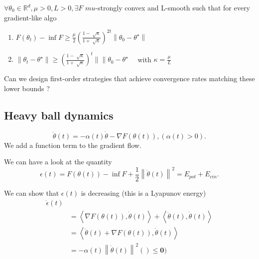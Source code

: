 \begin{thm}[Nesterov 2003]
    $ \forall \theta _0 \in \mathbb{R}^d, \mu > 0, L > 0, \exists F $ $ mu $-strongly convex and L-smooth such that for every gradient-like algo \begin{enumerate}
        \item $ F(\theta _t) - \inf F \geq  \frac{\mu }{2} ( \frac{1 - \sqrt[]{\kappa }}{1 + \sqrt[]{\kappa }} )^{2t} \left\| \theta _0 - \theta ^\star  \right\|  $ 
        \item $\left\| \theta _t - \theta ^{\star } \right\| \geq (\frac{1 - \sqrt[]{\kappa }}{1 + \sqrt[]{\kappa }})^t \left\|  \right\| \theta _0 - \theta ^{\star } \quad $ with $\kappa = \frac{\mu }{L}$ 
    \end{enumerate}
\end{thm}

Can we design first-order strategies that achieve convergence rates matching these lower bounds ? 

\subsection{Heavy ball dynamics}

\[
    \ddot{\theta }(t) = - \alpha (t) \dot{\theta } - \nabla F(\theta (t)), (\alpha (t) > 0 )
.\]
We add a function term to the gradient flow. 

We can have a look at the quantity 
\[
    \epsilon (t) = F(\theta (t)) - \inf F + \frac{1}{2} \left\| \dot{\theta }(t) \right\| ^2 = E_{pot} + E_{cin}
.\]

We can show that $ \epsilon (t) $ is decreasing (this is a Lyapunov energy) 
\begin{align*}
    \dot{\epsilon }(t) \\
        &= \left\langle \nabla F(\theta (t)) , \dot{\theta }(t) \right\rangle + \left\langle \ddot{\theta }(t) , \dot{\theta }(t) \right\rangle \\
        &= \left\langle \ddot{\theta }(t) + \nabla F(\theta (t)), \dot{\theta }(t) \right\rangle \\
        &= - \alpha (t) \left\| \dot{\theta }(t) \right\| ^2 \mathbf{()\leq 0)}
\end{align*}

